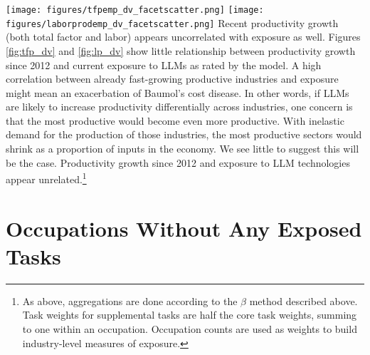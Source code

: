 \documentclass[11pt]{article}
\begin{document}
\texttt{[image: figures/tfpemp\_dv\_facetscatter.png]}
\label{fig:tfp_dv}
\texttt{[image: figures/laborprodemp\_dv\_facetscatter.png]}
\label{fig:lp_dv}
Recent productivity growth (both total factor and labor) appears uncorrelated with exposure as well. Figures \ref{fig:tfp_dv} and \ref{fig:lp_dv} show little relationship between productivity growth since 2012 and current exposure to LLMs as rated by the model. A high correlation between already fast-growing productive industries and exposure might mean an exacerbation of Baumol's cost disease. In other words, if LLMs are likely to increase productivity differentially across industries, one concern is that the most productive would become even more productive. With inelastic demand for the production of those industries, the most productive sectors would shrink as a proportion of inputs in the economy. We see little to suggest this will be the case. Productivity growth since 2012 and exposure to LLM technologies appear unrelated.\footnote{As above, aggregations are done according to the $\beta$ method described above. Task weights for supplemental tasks are half the core task weights, summing to one within an occupation. Occupation counts are used as weights to build industry-level measures of exposure.}

\section{Occupations Without Any Exposed Tasks}
\label{subsec:noexposure}



%   

 

  
\end{document}
